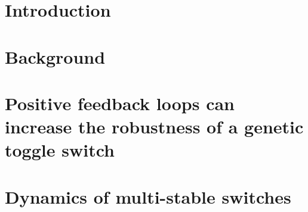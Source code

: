 \documentclass[]{phdthesis}
\begin{document}
\printglossary[type=\acronymtype, title=Abbreviations, toctitle=List of Abbreviations]





\mainmatter*
\chapter{Introduction}
\label{ch:Intro}


\mainmatter*
\chapter{Background}
\label{ch:backg}



%

\mainmatter*
\chapter{Positive feedback loops can increase the robustness of a genetic toggle switch}
\label{ch:abcsysbio}



\mainmatter*
 
\chapter{Dynamics of multi-stable switches}
\label{ch:SF}

%
%
%
%
%
\end{document}
